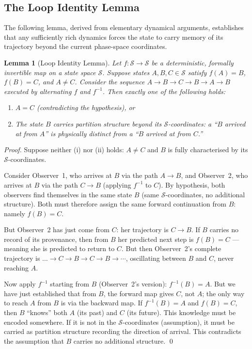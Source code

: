 \documentclass[twocolumn,10pt,a4paper]{article}
\theoremstyle{thmstyle}
\newtheorem{lemma}[theorem]{Lemma}
\theoremstyle{definition}
\theoremstyle{remark}
\newcommand{\StateSpace}{\mathcal{S}}
\begin{document}
\subsection{The Loop Identity Lemma}

The following lemma, derived from elementary dynamical arguments, establishes that any sufficiently rich dynamics forces the state to carry memory of its trajectory beyond the current phase-space coordinates.

\begin{lemma}[Loop Identity Lemma]
\label{lem:loop}
Let $f : \StateSpace \to \StateSpace$ be a deterministic, formally invertible map on a state space $\StateSpace$. Suppose states $A, B, C \in \StateSpace$ satisfy $f(A) = B$, $f(B) = C$, and $A \neq C$. Consider the sequence $A \to B \to C \to B \to A \to B$ executed by alternating $f$ and $f^{-1}$. Then exactly one of the following holds:
\begin{enumerate}[leftmargin=1.5em,label=(\roman*)]
\item $A = C$ (contradicting the hypothesis), or
\item The state $B$ carries partition structure beyond its $\StateSpace$-coordinates: a ``$B$ arrived at from $A$'' is physically distinct from a ``$B$ arrived at from $C$.''
\end{enumerate}
\end{lemma}

\begin{proof}
Suppose neither (i) nor (ii) holds: $A \neq C$ and $B$ is fully characterised by its $\StateSpace$-coordinates.

Consider Observer~1, who arrives at $B$ via the path $A \to B$, and Observer~2, who arrives at $B$ via the path $C \to B$ (applying $f^{-1}$ to $C$). By hypothesis, both observers find themselves in the same state $B$ (same $\StateSpace$-coordinates, no additional structure). Both must therefore assign the same forward continuation from $B$: namely $f(B) = C$.

But Observer~2 has just come from $C$: her trajectory is $C \to B$. If $B$ carries no record of its provenance, then from $B$ her predicted next step is $f(B) = C$ --- meaning she is predicted to return to $C$. But then Observer~2's complete trajectory is $\ldots \to C \to B \to C \to B \to \cdots$, oscillating between $B$ and $C$, never reaching $A$.

Now apply $f^{-1}$ starting from $B$ (Observer~2's version): $f^{-1}(B) = A$. But we have just established that from $B$, the forward map gives $C$, not $A$; the only way to reach $A$ from $B$ is via the backward map. If $f^{-1}(B) = A$ and $f(B) = C$, then $B$ ``knows'' both $A$ (its past) and $C$ (its future). This knowledge must be encoded somewhere. If it is not in the $\StateSpace$-coordinates (assumption), it must be carried as partition structure recording the direction of arrival. This contradicts the assumption that $B$ carries no additional structure. \qed
\end{proof}
\end{document}
